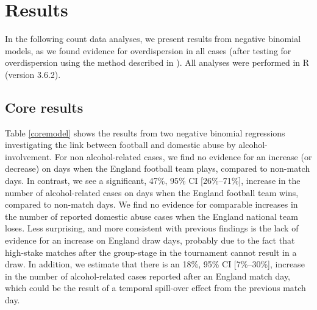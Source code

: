 \documentclass[12pt, a4paper]{article}
\begin{document}
\newpage

\section{Results}

In the following count data analyses, we present results from negative binomial models, as we found evidence for overdispersion in all cases (after testing for overdispersion using the method described in ). All analyses were performed in R (version 3.6.2).


\subsection{Core results} 

Table \ref{coremodel} shows the results from two negative binomial regressions investigating the link between football and domestic abuse by alcohol-involvement. For non alcohol-related cases, we find no evidence for an increase (or decrease) on days when the England football team plays, compared to non-match days. In contrast, we see a significant, 47\%, 95\% CI [26\%--71\%], increase in the number of alcohol-related cases on days when the England football team wins, compared to non-match days. We find no evidence for comparable increases in the number of reported domestic abuse cases when the England national team loses. Less surprising, and more consistent with previous findings is the lack of evidence for an increase on England draw days, probably due to the fact that high-stake matches after the group-stage in the tournament cannot result in a draw. In addition, we estimate that there is an 18\%, 95\% CI [7\%--30\%], increase in the number of alcohol-related cases reported after an England match day, which could be the result of a temporal spill-over effect from the previous match day. 
\end{document}
